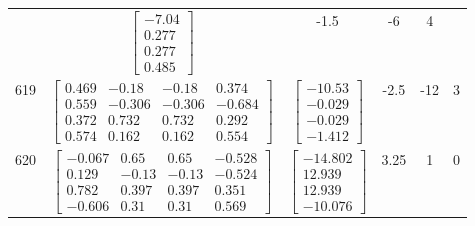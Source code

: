 \documentclass[a4paper,12pt]{article}
\begin{document}
\begin{tabular}{c c c c c c}
&
$\begin{bmatrix} -7.04 \\ 0.277 \\ 0.277 \\ 0.485 \end{bmatrix}$
&
-1.5
&
-6
&
4
\\
619
&
$\begin{bmatrix} 0.469 & -0.18 & -0.18 & 0.374 \\ 0.559 & -0.306 & -0.306 & -0.684 \\ 0.372 & 0.732 & 0.732 & 0.292 \\ 0.574 & 0.162 & 0.162 & 0.554 \end{bmatrix}$
&
$\begin{bmatrix} -10.53 \\ -0.029 \\ -0.029 \\ -1.412 \end{bmatrix}$
&
-2.5
&
-12
&
3
\\
620
&
$\begin{bmatrix} -0.067 & 0.65 & 0.65 & -0.528 \\ 0.129 & -0.13 & -0.13 & -0.524 \\ 0.782 & 0.397 & 0.397 & 0.351 \\ -0.606 & 0.31 & 0.31 & 0.569 \end{bmatrix}$
&
$\begin{bmatrix} -14.802 \\ 12.939 \\ 12.939 \\ -10.076 \end{bmatrix}$
&
3.25
&
1
&
0
\\
\end{tabular} \egroup \newpage
\end{document}

